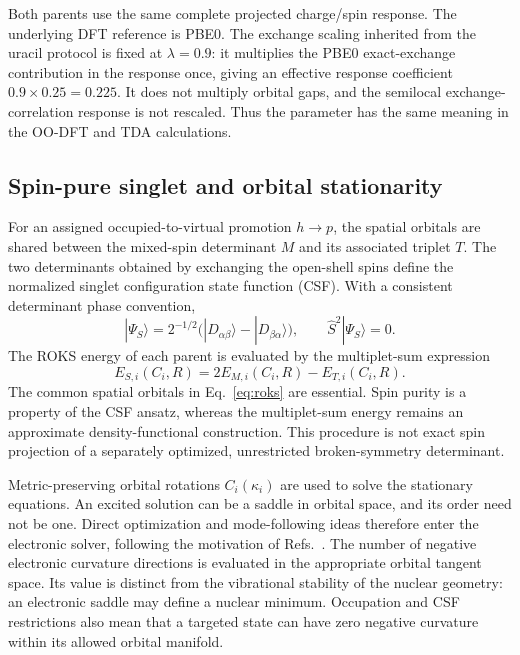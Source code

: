 \documentclass[11pt,a4paper]{article}
\begin{document}
Both parents use the same complete projected charge/spin response. The underlying DFT reference is PBE0.\cite{pbe0} The exchange scaling inherited from the uracil protocol is fixed at $\lambda=0.9$: it multiplies the PBE0 exact-exchange contribution in the response once, giving an effective response coefficient $0.9\times0.25=0.225$. It does not multiply orbital gaps, and the semilocal exchange-correlation response is not rescaled. Thus the parameter has the same meaning in the OO-DFT and TDA calculations.

\subsection{Spin-pure singlet and orbital stationarity}
For an assigned occupied-to-virtual promotion $h\rightarrow p$, the spatial orbitals are shared between the mixed-spin determinant $M$ and its associated triplet $T$. The two determinants obtained by exchanging the open-shell spins define the normalized singlet configuration state function (CSF). With a consistent determinant phase convention,
\begin{equation}
 |\Psi_S\rangle=2^{-1/2}\bigl(|D_{\alpha\beta}\rangle-|D_{\beta\alpha}\rangle\bigr),
 \qquad \hat S^2|\Psi_S\rangle=0.
\end{equation}
The ROKS energy of each parent is evaluated by the multiplet-sum expression
\begin{equation}
 E_{S,i}(C_i,R)=2E_{M,i}(C_i,R)-E_{T,i}(C_i,R).\label{eq:roks}
\end{equation}
The common spatial orbitals in Eq.~\eqref{eq:roks} are essential. Spin purity is a property of the CSF ansatz, whereas the multiplet-sum energy remains an approximate density-functional construction. This procedure is not exact spin projection of a separately optimized, unrestricted broken-symmetry determinant.

Metric-preserving orbital rotations $C_i(\kappa_i)$ are used to solve the stationary equations. An excited solution can be a saddle in orbital space, and its order need not be one. Direct optimization and mode-following ideas therefore enter the electronic solver, following the motivation of Refs.~. The number of negative electronic curvature directions is evaluated in the appropriate orbital tangent space. Its value is distinct from the vibrational stability of the nuclear geometry: an electronic saddle may define a nuclear minimum. Occupation and CSF restrictions also mean that a targeted state can have zero negative curvature within its allowed orbital manifold.
\end{document}
